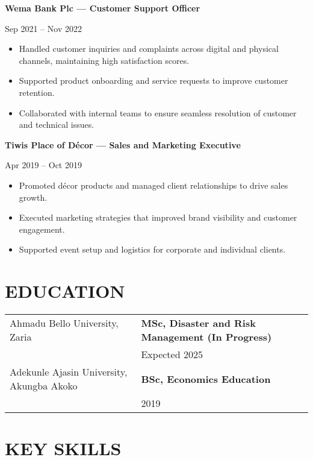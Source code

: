 \documentclass[a4paper,12pt]{article}
\newenvironment{joblong}[2]
{
  \vspace{4pt}
  \noindent
  \begin{minipage}[t]{0.75\textwidth}
    \textbf{#1}
  \end{minipage}%
  \hfill
  \begin{minipage}[t]{0.23\textwidth}
    \raggedleft #2
  \end{minipage}
  \vspace{2pt}
  \begin{itemize}[leftmargin=1em,itemsep=3pt,label=--,topsep=2pt]
}
{
  \end{itemize}
  \vspace{4pt}
}
\begin{document}
\begin{joblong}{Wema Bank Plc — Customer Support Officer}{Sep 2021 -- Nov 2022}
\item Handled customer inquiries and complaints across digital and physical channels, maintaining high satisfaction scores.
\item Supported product onboarding and service requests to improve customer retention.
\item Collaborated with internal teams to ensure seamless resolution of customer and technical issues.
\end{joblong}

\begin{joblong}{Tiwis Place of Décor — Sales and Marketing Executive}{Apr 2019 -- Oct 2019}
\item Promoted décor products and managed client relationships to drive sales growth.
\item Executed marketing strategies that improved brand visibility and customer engagement.
\item Supported event setup and logistics for corporate and individual clients.
\end{joblong}


\section{EDUCATION}

\begin{tabularx}{\linewidth}{@{}l X@{}}
Ahmadu Bello University, Zaria & \textbf{MSc, Disaster and Risk Management (In Progress)} \\
                               & Expected 2025 \\[10pt]
Adekunle Ajasin University, Akungba Akoko & \textbf{BSc, Economics Education} \\
                               & 2019 \\[10pt]
\end{tabularx}


\section{KEY SKILLS}
\end{document}

